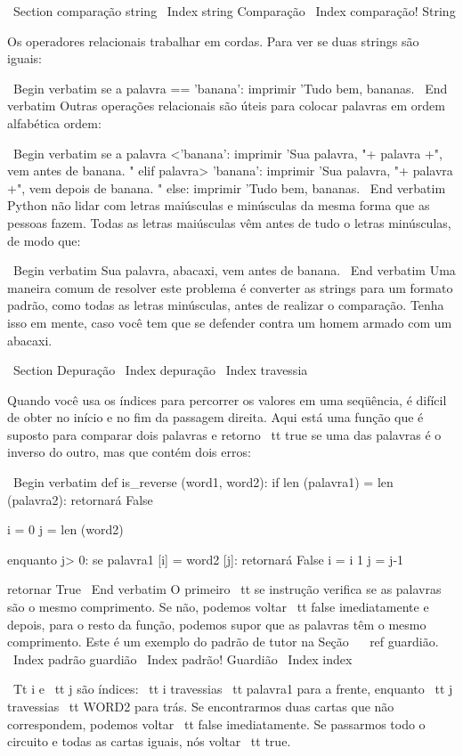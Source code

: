 \documentclass[10pt]{book}
\begin{document}
\begin {itemize}
{{{{{{\ Section {comparação string}
\ Index {string Comparação}
\ Index {comparação! String}

Os operadores relacionais trabalhar em cordas. Para ver se duas strings são iguais:

\ Begin {verbatim}
se a palavra == 'banana':
    imprimir 'Tudo bem, bananas.
\ End {verbatim}
%
Outras operações relacionais são úteis para colocar palavras em ordem alfabética
ordem:

\ Begin {verbatim}
se a palavra <'banana':
    imprimir 'Sua palavra, "+ palavra +", vem antes de banana. "
elif palavra> 'banana':
    imprimir 'Sua palavra, "+ palavra +", vem depois de banana. "
else:
    imprimir 'Tudo bem, bananas.
\ End {verbatim}
%
Python não lidar com letras maiúsculas e minúsculas da mesma forma
que as pessoas fazem. Todas as letras maiúsculas vêm antes de tudo o
letras minúsculas, de modo que:

\ Begin {verbatim}
Sua palavra, abacaxi, vem antes de banana.
\ End {verbatim}
%
Uma maneira comum de resolver este problema é converter as strings para um
formato padrão, como todas as letras minúsculas, antes de realizar o
comparação. Tenha isso em mente, caso você tem que se defender
contra um homem armado com um abacaxi.


\ Section {} Depuração
\ Index {depuração}
\ Index {travessia}

Quando você usa os índices para percorrer os valores em uma seqüência,
é difícil de obter no início e no fim da passagem
direita. Aqui está uma função que é suposto para comparar dois
palavras e retorno {\ tt true} se uma das palavras é o inverso
do outro, mas que contém dois erros:

\ Begin {verbatim}
def is_reverse (word1, word2):
    if len (palavra1) = len (palavra2):
        retornará False
    
    i = 0
    j = len (word2)

    enquanto j> 0:
        se palavra1 [i] = word2 [j]:
            retornará False
        i = i 1
        j = j-1

    retornar True
\ End {verbatim}
%
O primeiro {\ tt se} instrução verifica se as palavras são o
mesmo comprimento. Se não, podemos voltar {\ tt false} imediatamente
e depois, para o resto da função, podemos supor que as palavras
têm o mesmo comprimento. Este é um exemplo do padrão de tutor
na Seção ~ \ ref {} guardião.
\ Index {padrão guardião}
\ Index {padrão! Guardião}
\ Index {index}

{\ Tt i} e {\ tt j} são índices: {\ tt i} travessias {\ tt palavra1}
para a frente, enquanto {\ tt j} travessias {\ tt WORD2} para trás. Se encontrarmos
duas cartas que não correspondem, podemos voltar {\ tt false} imediatamente.
Se passarmos todo o circuito e todas as cartas iguais, nós
voltar {\ tt true}.

}}}}}}
\end{itemize}
\end{document}
